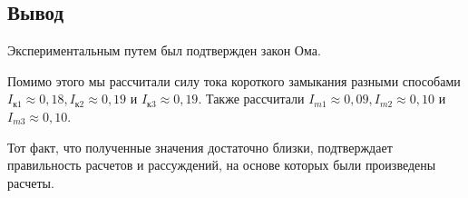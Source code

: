 \documentclass[12pt]{article}
\begin{document}
\begin{enumerate}
\section*{Вывод}
Экспериментальным путем был подтвержден закон Ома.

Помимо этого мы рассчитали силу тока короткого замыкания разными способами $I_{к1} \approx 0,18, I_{к2} \approx 0,19$ и $I_{к3} \approx 0,19$. Также рассчитали $I_{m1} \approx 0,09, I_{m2} \approx 0,10$ и  $I_{m3} \approx 0,10$.

Тот факт, что полученные значения достаточно близки, подтверждает правильность расчетов и рассуждений, на основе которых были произведены расчеты. 
 \end{enumerate}
\end{document}
